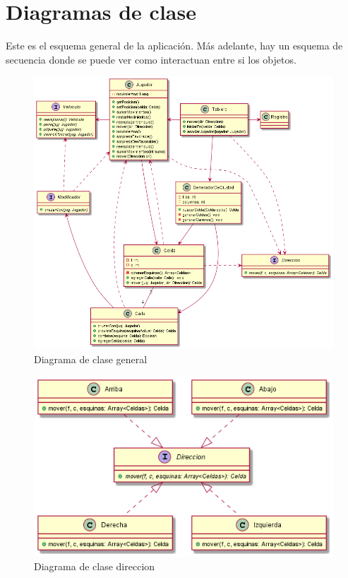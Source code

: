 \documentclass[titlepage,a4paper]{article}
\begin{document}
\section{Diagramas de clase}\label{sec:diagramasdeclase}

Este es el esquema general de la aplicación. Más adelante, hay un esquema de secuencia donde se puede ver como interactuan entre si los objetos.


\begin{figure}[H]
  \centering
  \includegraphics[width=1\textwidth]{diagramas/modelo-inicial.png}
  \caption{\label{fig:seq01} Diagrama de clase general}
\end{figure}

\begin{figure}[H]
  \centering
  \includegraphics[width=1\textwidth]{diagramas/ClaseDireccion.png}
  \caption{\label{fig:seq02} Diagrama de clase direccion}
\end{figure}
\end{document}
